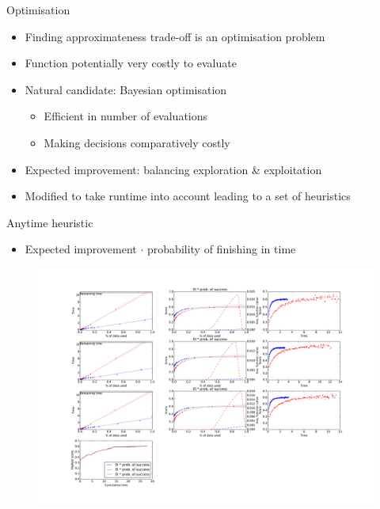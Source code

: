 \documentclass[handout]{beamer}
\begin{document}
\begin{frame}{Optimisation}
	\begin{itemize}
		\item<1-> Finding approximateness trade-off is an optimisation problem
		\item<2-> Function potentially very costly to evaluate
		\item<3-> Natural candidate: Bayesian optimisation
		\begin{itemize}
			\item<4-> Efficient in number of evaluations
			\item<5-> Making decisions comparatively costly
		\end{itemize}
		\item<6-> Expected improvement: balancing exploration \& exploitation
		\item<7-> Modified to take runtime into account leading to a set of heuristics
	\end{itemize}
\end{frame}


\begin{frame}{Anytime heuristic}
\begin{itemize}
\item Expected improvement $\cdot$ probability of finishing in time	
\end{itemize}

\begin{figure}
\centering
  \includegraphics[trim=140 710 493 55,clip,width=\textwidth]{ei_probofsuccess2.pdf}
  \label{sched:expimprpertime02}
\end{figure}
\end{frame}
\end{document}

